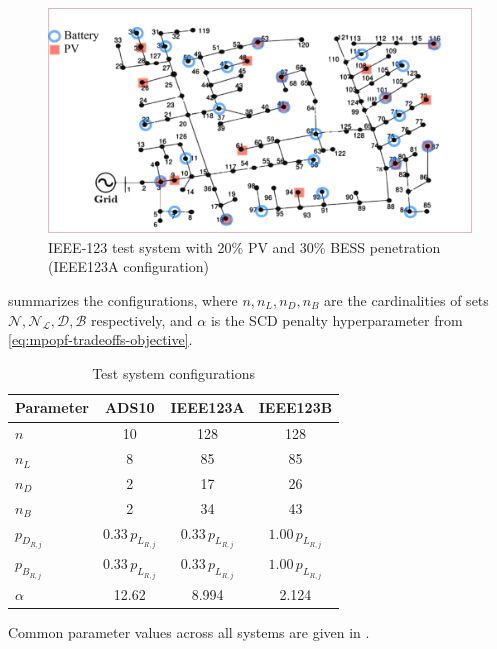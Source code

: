 \begin{figure}[t]
    \centering
    \includegraphics[width=\linewidth]{figures/ieee123-pv20-batt30.png}
    \caption{IEEE-123 test system with 20\% PV and 30\% BESS penetration (IEEE123A configuration)}
    \label{fig:mpopf-tradeoffs-ieee123}
\end{figure}

 summarizes the configurations, where $n, n_L, n_D, n_B$ are the cardinalities of sets $\mathcal{N}, \mathcal{N_L}, \mathcal{D}, \mathcal{B}$ respectively, and $\alpha$ is the SCD penalty hyperparameter from \cref{eq:mpopf-tradeoffs-objective}.

\begin{table}[t]
    \centering
    \caption{Test system configurations}
    \label{table:mpopf-tradeoffs-system-config}
    \begin{tabular}{|l|c|c|c|}
    \hline
    \textbf{Parameter} & \textbf{ADS10} & \textbf{IEEE123A} & \textbf{IEEE123B} \\ \hline
    $n$ & 10 & 128 & 128 \\ \hline
    $n_{L}$ & 8 & 85 & 85 \\ \hline
    $n_{D}$ & 2 & 17 & 26 \\ \hline
    $n_{B}$ & 2 & 34 & 43 \\ \hline
    $p_{D_{R,j}}$ & $0.33 \, p_{L_{R,j}}$ & $0.33 \, p_{L_{R,j}}$ & $1.00 \, p_{L_{R,j}}$ \\ \hline
    $p_{B_{R,j}}$ & $0.33 \, p_{L_{R,j}}$ & $0.33 \, p_{L_{R,j}}$ & $1.00 \, p_{L_{R,j}}$ \\ \hline
    $\alpha$ & 12.62 & 8.994 & 2.124 \\ \hline
    \end{tabular}
\end{table}

Common parameter values across all systems are given in .

